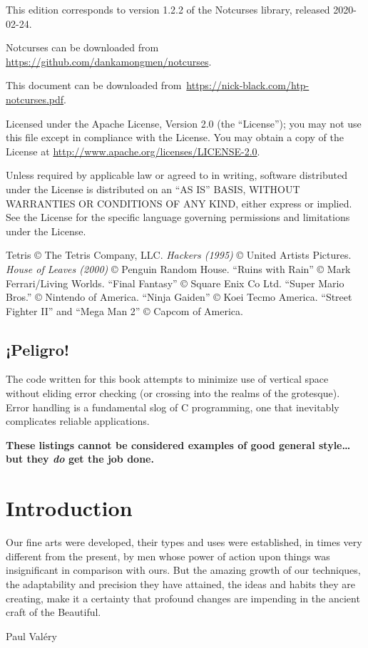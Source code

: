 \documentclass[letterpaper,10pt]{article}
\begin{document}
\small{This edition corresponds to version 1.2.2 of the Notcurses
library, released 2020-02-24.

Notcurses can be downloaded from
\url{https://github.com/dankamongmen/notcurses}.

This document can be downloaded
from~\url{https://nick-black.com/htp-notcurses.pdf}.

Licensed under the Apache License, Version 2.0 (the ``License''); you may not use
this file except in compliance with the License. You may obtain a copy of the
License at \url{http://www.apache.org/licenses/LICENSE-2.0}.

Unless required by applicable law or agreed to in writing, software
distributed under the License is distributed on an ``AS IS'' BASIS,
WITHOUT WARRANTIES OR CONDITIONS OF ANY KIND, either express or implied.
See the License for the specific language governing permissions and
limitations under the License.

Tetris © The Tetris Company, LLC.
\textit{Hackers (1995)} © United Artists Pictures.
\textit{House of Leaves (2000)} © Penguin Random House.
``Ruins with Rain'' © Mark Ferrari/Living Worlds.
``Final Fantasy'' © Square Enix Co Ltd.
``Super Mario Bros.'' © Nintendo of America.
``Ninja Gaiden'' © Koei Tecmo America.
``Street Fighter II'' and ``Mega Man 2'' © Capcom of America.

\subsection{¡Peligro!}

The code written for this book attempts to minimize use of vertical space
without eliding error checking (or crossing into the realms of the grotesque).
Error handling is a fundamental slog of C programming, one that
inevitably complicates reliable applications.

\textbf{These listings cannot be considered examples of good general style\ldots but they \textit{do} get the job done.}

}


\clearpage

\section{Introduction}
\epigraph{Our fine arts were developed, their types and uses were established, in times
very different from the present, by men whose power of action upon things was
insignificant in comparison with ours. But the amazing growth of our
techniques, the adaptability and precision they have attained, the ideas and
habits they are creating, make it a certainty that profound changes are
impending in the ancient craft of the Beautiful.}{Paul Valéry}
\end{document}
